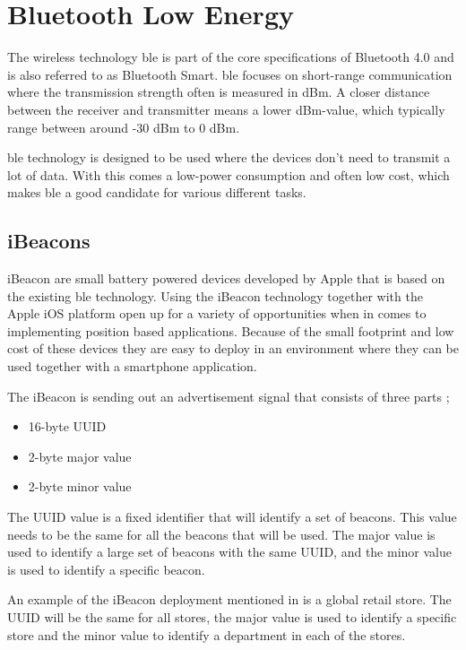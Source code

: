 \section{Bluetooth Low Energy}\label{sec:theoryBle}
The wireless technology \acrfull{ble} is part of the core specifications of Bluetooth 4.0 and is also referred to as Bluetooth Smart.
\acrshort{ble} focuses on short-range communication where the transmission strength often is measured in dBm.
A closer distance between the receiver and transmitter means a lower dBm-value, which typically range between around -30 dBm to 0 dBm.
\cite{DevelopmentMobileIndoor2017} 

\bigskip

\acrshort{ble} technology is designed to be used where the devices don't need to transmit a lot of data.
With this comes a low-power consumption and often low cost, which makes \acrshort{ble} a good candidate for various different tasks.
\cite{PracticalFingerprintingLocalization2017} 


\subsection{iBeacons}\label{sec:theoryBleiBeacons}
iBeacon are small battery powered devices developed by Apple that is based on the existing \acrshort{ble} technology.
Using the iBeacon technology together with the Apple iOS platform open up for a variety of opportunities when in comes to implementing position based applications.
Because of the small footprint and low cost of these devices they are easy to deploy in an environment where they can be used together with a smartphone application.
\cite{BluetoothLowEnergy2018} 

\bigskip

The iBeacon is sending out an advertisement signal that consists of three parts \cite{GettingStartedIBeacon2014};
\begin{itemize}
\item 16-byte UUID
\item 2-byte major value
\item 2-byte minor value
\end{itemize}

The UUID value is a fixed identifier that will identify a set of beacons.
This value needs to be the same for all the beacons that will be used.
The major value is used to identify a large set of beacons with the same UUID, and the minor value is used to identify a specific beacon.
\cite{GettingStartedIBeacon2014}

\bigskip

An example of the iBeacon deployment mentioned in \cite{GettingStartedIBeacon2014} is a global retail store. The UUID will be the same for all stores, the major value is used to identify a specific store and the minor value to identify a department in each of the stores.
\cite{GettingStartedIBeacon2014} 


